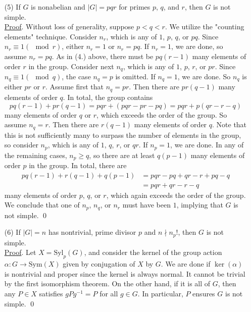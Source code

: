 \documentclass[11pt]{amsart}
\theoremstyle{definition}
\renewenvironment{proof}{\underline{Proof}.}{\qed}
\renewcommand\geq{\geqslant}
\renewcommand\:{\colon}
\newcommand{\1}{\mathds{1}}
\newcommand{\Syl}{\text{Syl}}
\newcommand{\Sym}{\text{Sym}}
\begin{document}
\begin{enumerate}[leftmargin=*]
\begin{proof}
\end{proof}
\item[(5)] If $G$ is nonabelian and $|G| = pqr$ for primes $p$, $q$, and $r$, then $G$ is not simple. \\
\begin{proof}
	Without loss of generality, suppose $p < q < r$. We utilize the "counting elements" technique. Consider $n_r$, which is any of $1$, $p$, $q$, or $pq$. Since $n_r \equiv 1 (\mod r)$, either $n_r = 1$ or $n_r = pq$. If $n_r = 1$, we are done, so assume $n_r = pq$. As in (4.) above, there must be $pq(r-1)$ many elements of order $r$ in the group. Consider next $n_q$, which is any of $1$, $p$, $r$, or $pr$. Since $n_q \equiv 1 (\mod q)$, the case $n_q = p$ is omitted. If $n_q = 1$, we are done. So $n_q$ is either $pr$ or $r$. Assume first that $n_q = pr$. Then there are $pr(q-1)$ many elements of order $q$. In total, the group contains
		\[ pq(r-1) + pr(q-1) = pqr + (pqr - pr- pq) = pqr + p(qr - r - q) \]
	many elements of order $q$ or $r$, which exceeds the order of the group. So assume $n_q = r$. Then there are $r(q - 1)$ many elements of order $q$. Note that this is not sufficiently many to surpass the number of elements in the group, so consider $n_p$, which is any of $1$, $q$, $r$, or $qr$. If $n_p = 1$, we are done. In any of the remaining cases, $n_p \geq q$, so there are at least $q(p - 1)$ many elements of order $p$ in the group. In total, there are
	\begin{align*}
		pq(r - 1) + r(q - 1) + q(p - 1) &= pqr - pq + qr - r + pq - q \\
		&= pqr + qr - r - q
	\end{align*}
	many elements of order $p$, $q$, or $r$, which again exceeds the order of the group. We conclude that one of $n_p$, $n_q$, or $n_r$ must have been $1$, implying that $G$ is not simple.
\end{proof}
\item[(6)] If $|G| = n$ has nontrivial, prime divisor $p$ and $n \nmid n_p!$, then $G$ is not simple. \\
\begin{proof}
	Let $X = \Syl_p(G)$, and consider the kernel of the group action $\alpha\: G \to \Sym(X)$ given by conjugation of $X$ by $G$. We are done if $\ker(\alpha)$ is nontrivial and proper since the kernel is always normal. It cannot be trivial by the first isomorphism theorem. On the other hand, if it is all of $G$, then any $P \in X$ satisfies $gPg^{-1} = P$ for all $g \in G$. In particular, $P$ ensures $G$ is not simple.
\end{proof}
\end{enumerate}
\end{document}
